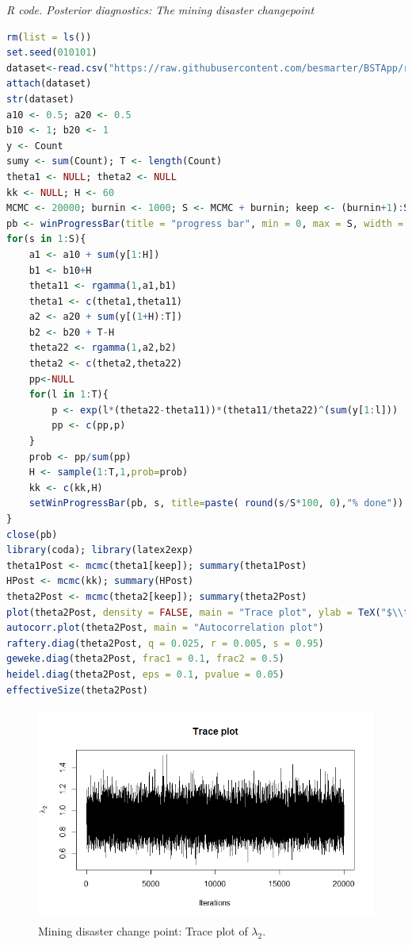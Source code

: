 \begin{tcolorbox}[enhanced,width=4.67in,center upper,
	fontupper=\large\bfseries,drop shadow southwest,sharp corners]
	\textit{R code. Posterior diagnostics: The mining disaster changepoint}
	\begin{VF}
		\begin{lstlisting}[language=R]
rm(list = ls())
set.seed(010101)
dataset<-read.csv("https://raw.githubusercontent.com/besmarter/BSTApp/refs/heads/master/DataApp/MiningDataCarlin.csv",header=T)
attach(dataset)
str(dataset)
a10 <- 0.5; a20 <- 0.5
b10 <- 1; b20 <- 1
y <- Count
sumy <- sum(Count); T <- length(Count)
theta1 <- NULL; theta2 <- NULL
kk <- NULL; H <- 60
MCMC <- 20000; burnin <- 1000; S <- MCMC + burnin; keep <- (burnin+1):S
pb <- winProgressBar(title = "progress bar", min = 0, max = S, width = 300)
for(s in 1:S){
	a1 <- a10 + sum(y[1:H])
	b1 <- b10+H
	theta11 <- rgamma(1,a1,b1)
	theta1 <- c(theta1,theta11)
	a2 <- a20 + sum(y[(1+H):T])
	b2 <- b20 + T-H
	theta22 <- rgamma(1,a2,b2)
	theta2 <- c(theta2,theta22)
	pp<-NULL
	for(l in 1:T){
		p <- exp(l*(theta22-theta11))*(theta11/theta22)^(sum(y[1:l]))
		pp <- c(pp,p)
	}
	prob <- pp/sum(pp)
	H <- sample(1:T,1,prob=prob)
	kk <- c(kk,H)
	setWinProgressBar(pb, s, title=paste( round(s/S*100, 0),"% done"))
}
close(pb)
library(coda); library(latex2exp)
theta1Post <- mcmc(theta1[keep]); summary(theta1Post)
HPost <- mcmc(kk); summary(HPost)
theta2Post <- mcmc(theta2[keep]); summary(theta2Post) 
plot(theta2Post, density = FALSE, main = "Trace plot", ylab = TeX("$\\theta_{2}$"))
autocorr.plot(theta2Post, main = "Autocorrelation plot")
raftery.diag(theta2Post, q = 0.025, r = 0.005, s = 0.95)
geweke.diag(theta2Post, frac1 = 0.1, frac2 = 0.5)
heidel.diag(theta2Post, eps = 0.1, pvalue = 0.05)
effectiveSize(theta2Post)
\end{lstlisting}
	\end{VF}
\end{tcolorbox} 
 
\begin{figure}[!h]
	\includegraphics[width=340pt, height=200pt]{Chapters/chapter5/figures/TracePlot.png}
	\caption[List of figure caption goes here]{ Mining disaster change point: Trace plot of $\lambda_2$.}\label{fig511}
\end{figure}

